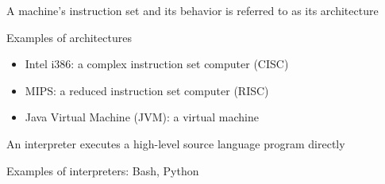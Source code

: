 \documentclass[8pt,a4paper,compress]{beamer}
\begin{document}
\begin{frame}[fragile]
\pause

A machine's instruction set and its behavior is referred to as its architecture

\pause\bigskip

Examples of architectures
\begin{itemize}
\pause
\item Intel i386: a complex instruction set computer (CISC)

\pause
\item MIPS: a reduced instruction set computer (RISC)

\pause
\item Java Virtual Machine (JVM): a virtual machine
\end{itemize}
\end{frame}

\begin{frame}[fragile]
\pause

An interpreter executes a high-level source language program directly

\begin{center}
\end{center}

\pause\bigskip

Examples of interpreters: Bash, Python
\end{frame}
\end{document}

